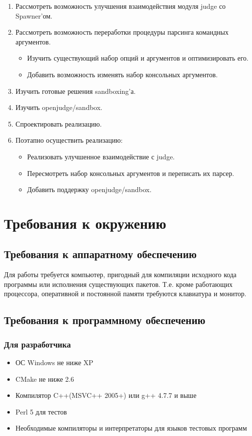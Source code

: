 \documentclass{imcs}
\begin{document}
\begin{enumerate}
    \item Рассмотреть возможность улучшения взаимодействия модуля judge со Spawner'ом.
    \item Рассмотреть возможность переработки процедуры парсинга командных аргументов.
      \begin{itemize}
          \item Изучить существующий набор опций и аргументов и оптимизировать его.
          \item Добавить возможность изменять набор консольных аргументов.
      \end{itemize}        
    \item Изучить готовые решения sandboxing'а.
    \item Изучить openjudge/sandbox.
    \item Спроектировать реализацию.
    \item Поэтапно осуществить реализацию:
      \begin{itemize}
          \item Реализовать улучшенное взаимодействие с judge.
          \item Пересмотреть набор консольных аргументов и переписать их парсер.
          \item Добавить поддержку openjudge/sandbox.
      \end{itemize}        
\end{enumerate}

\section{Требования к окружению}

\subsection{Требования к аппаратному обеспечению}

Для работы требуется компьютер, пригодный для компиляции исходного кода программы или исполнения существующих пакетов.
Т.е. кроме работающих процессора, оперативной и постоянной памяти требуются
клавиатура и монитор.

\subsection{Требования к программному обеспечению}

\subsubsection{Для разработчика}
\begin{itemize}
  \item ОС Windows не ниже XP
  \item CMake не ниже 2.6
  \item Компилятор C++(MSVC++ 2005+) или g++ 4.7.7 и выше
  \item Perl 5 для тестов
  \item Необходимые компиляторы и интерпретаторы для языков тестовых программ
\end{itemize}
\end{document}
